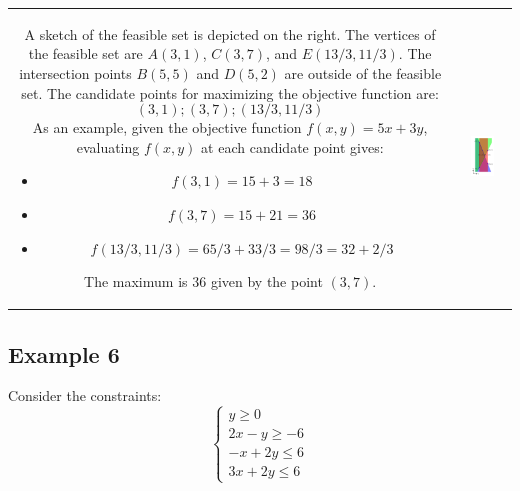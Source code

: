 \documentclass{article}
\begin{document}
\begin{tabular}{cc}
\parbox{0.5\textwidth}{
A sketch of the feasible set is depicted on the right. The vertices of the feasible set are \(A(3, 1)\), \(C(3, 7)\), and \(E(13/3, 11/3)\). The intersection points \(B(5, 5)\) and \(D(5, 2)\) are outside of the feasible set. The candidate points for maximizing the objective function are:
\[(3,1); (3,7); (13/3,11/3)\]
As an example, given the objective function \(f(x,y) = 5x + 3y\), evaluating \(f(x,y)\) at each candidate point gives:
\begin{itemize}
\item \(f(3, 1) = 15 + 3 = 18\) 
\item \(f(3, 7) = 15 + 21 = 36\) 
\item \(f(13/3,11/3) = 65/3 + 33/3 = 98/3 = 32 + 2/3\) 
\end{itemize}
The maximum is \(36\) given by the point \((3, 7)\).
} & \parbox{0.5\textwidth}{
\includegraphics[width = 0.5\textwidth]{feasible_set_5}
}
\end{tabular}




\subsection*{Example 6}

Consider the constraints:
\[\left\{\begin{array}{c}
y \geq 0 \\
2x - y \geq -6 \\
-x + 2y \leq 6 \\
3x + 2y \leq 6
\end{array}\right.\]
\end{document}
